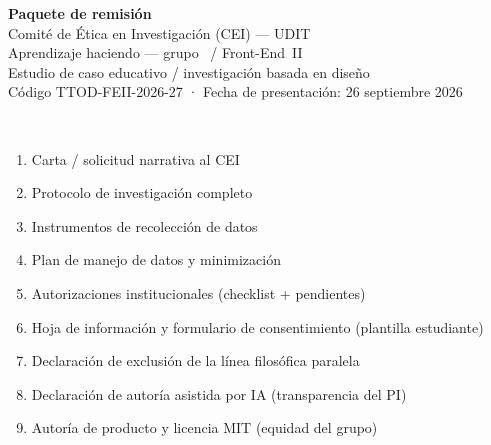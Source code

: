 \documentclass[11pt,a4paper]{scrartcl}
\begin{document}
\LogoRow

\begin{center}
  {\LARGE\sffamily\bfseries Paquete de remisión}\\[0.35em]
  {\Large\sffamily Comité de Ética en Investigación (CEI) --- UDIT}\\[0.8em]
  {\large\sffamily Aprendizaje haciendo --- grupo \TTODfull\ / Front-End~II}\\[0.3em]
  {\normalsize\color{uditnavy} Estudio de caso educativo / investigación basada en diseño}\\[0.6em]
  {\small Código TTOD-FEII-2026-27 · Fecha de presentación: 26 septiembre 2026}
\end{center}

\vspace{0.6em}
\StudyMetaPI

\vspace{0.55em}
\AuthoritiesBlock

\vspace{0.35em}
\DocsPrototypeNote

\vspace{0.7em}
\\[0.3em]
\begin{enumerate}
  \item Carta / solicitud narrativa al CEI
  \item Protocolo de investigación completo
  \item Instrumentos de recolección de datos
  \item Plan de manejo de datos y minimización
  \item Autorizaciones institucionales (checklist + pendientes)
  \item Hoja de información y formulario de consentimiento (plantilla estudiante)
  \item Declaración de exclusión de la línea filosófica paralela
  \item Declaración de autoría asistida por IA (transparencia del PI)
  \item Autoría de producto y licencia MIT (equidad del grupo)
\end{enumerate}

\vspace{0.4em}
\end{document}
